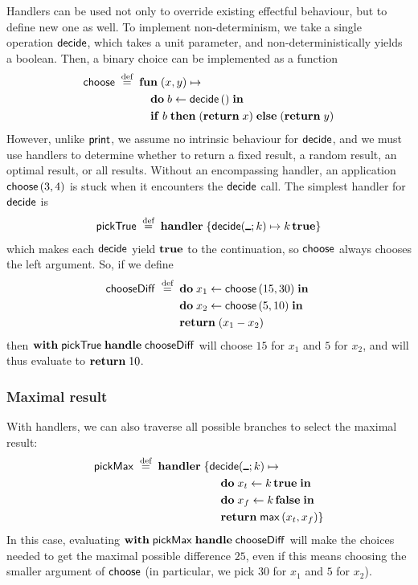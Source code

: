 \documentclass{article}
\begin{document}
Handlers can be used not only to override existing effectful behaviour, but to
define new one as well. To implement non-determinism, we take a single operation
$\mathsf{decide}$, which takes a unit parameter, and non-deterministically yields a
boolean. Then, a binary choice can be implemented as a function
%
\begin{align*}
  \mathord{\mathsf{choose}} \mathrel{\;\stackrel{\text{def}}{=}\;} {} & \mathbf{fun}\; (x, y) \mapsto \\
  &\quad \mathbf{do}\; b \leftarrow \mathsf{decide} \, \mathbf{()} \;\mathbf{in}\; \\
  &\quad \mathbf{if}\; b \;\mathbf{then}\; (\mathbf{return}\; x) \;\mathbf{else}\; (\mathbf{return}\; y)
\end{align*}
%
However, unlike $\mathsf{print}$, we assume no intrinsic behaviour for $\mathsf{decide}$, and we
must use handlers to determine whether to return a fixed result, a random result,
an optimal result, or all results. Without an encompassing handler, an
application $\mathord{\mathsf{choose}} \, (3, 4)$ is stuck when it encounters the $\mathsf{decide}$
call. The simplest handler for $\mathsf{decide}$ is
%
\begin{align*}
  \kst{pickTrue} \defeq \handler \{
  \opclause[\decide]{\anon}{k} k \, \tru
  \}
\end{align*}
%
which makes each $\mathsf{decide}$ yield $\mathbf{true}$ to the continuation, so $\mathord{\mathsf{choose}}$
always chooses the left argument. So, if we define
%
\begin{align*}
  \mathord{\mathsf{chooseDiff}} \mathrel{\;\stackrel{\text{def}}{=}\;} {}
    &\mathbf{do}\; x_1 \leftarrow \mathord{\mathsf{choose}} \, (15, 30) \;\mathbf{in}\; \\
    &\mathbf{do}\; x_2 \leftarrow \mathord{\mathsf{choose}} \, (5, 10) \;\mathbf{in}\; \\
    &\mathbf{return}\; (x_1 - x_2)
\end{align*}
%
then $\mathbf{with}\; \mathord{\mathsf{pickTrue}} \;\mathbf{handle}\; \mathord{\mathsf{chooseDiff}}$ will choose $15$ for $x_1$ and $5$ for $x_2$,
and will thus evaluate to $\mathbf{return}\; 10$.

\subsubsection{Maximal result}
\label{sec:pickmax}

With handlers, we can also traverse all possible branches to select the maximal
result:
\begin{align*}
  \kst{pickMax} \defeq \handler \{
  &\opclause[\decide]{\anon}{k} \\
  &\quad \seq{x_t}{k \, \tru} \\
  &\quad \seq{x_f}{k \, \fls} \\
  &\quad \return \kst{max} \, (x_t, x_f) 
  \}
\end{align*}
In this case, evaluating $\mathbf{with}\; \mathord{\mathsf{pickMax}} \;\mathbf{handle}\; \mathord{\mathsf{chooseDiff}}$ will
make the choices needed to get the maximal possible difference $25$, even if
this means choosing the smaller argument of $\mathord{\mathsf{choose}}$ (in particular, we pick $30$ for $x_1$ and $5$ for $x_2$).
\end{document}
